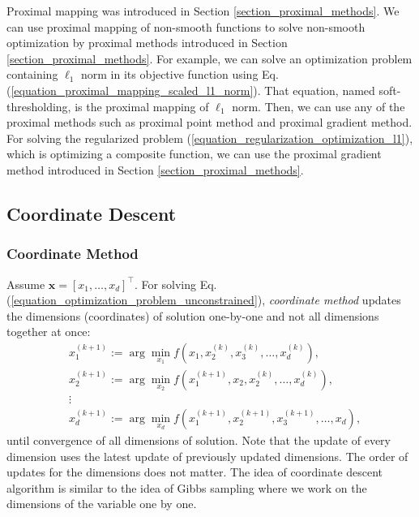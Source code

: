 \documentclass[lang=cn,10pt]{gorgeousnbook}
\numberwithin{equation}{section}%
\numberwithin{figure}{section}%
\begin{document}

Proximal mapping was introduced in Section \ref{section_proximal_methods}. We can use proximal mapping of non-smooth functions to solve non-smooth optimization by proximal methods introduced in Section \ref{section_proximal_methods}.
For example, we can solve an optimization problem containing $\ell_1$ norm in its objective function using Eq. (\ref{equation_proximal_mapping_scaled_l1_norm}). That equation, named soft-thresholding, is the proximal mapping of $\ell_1$ norm. Then, we can use any of the proximal methods such as proximal point method and proximal gradient method. 
For solving the regularized problem (\ref{equation_regularization_optimization_l1}), which is optimizing a composite function, we can use the proximal gradient method introduced in Section \ref{section_proximal_methods}. 

\subsection{Coordinate Descent}

\subsubsection{Coordinate Method}




Assume $\boldsymbol{x} = [x_1, \dots, x_d]^\top$.
For solving Eq. (\ref{equation_optimization_problem_unconstrained}), \textit{coordinate method} \cite{wright2015coordinate} updates the dimensions (coordinates) of solution one-by-one and not all dimensions together at once:
\begin{equation}\label{equation_coordinate_descent}
\begin{aligned}
& x_1^{(k+1)} := \arg\min_{x_1} f(x_1, x_2^{(k)}, x_3^{(k)}, \dots, x_d^{(k)}), \\
& x_2^{(k+1)} := \arg\min_{x_2} f(x_1^{(k+1)}, x_2, x_2^{(k)}, \dots, x_d^{(k)}), \\
&\vdots \\
& x_d^{(k+1)} := \arg\min_{x_d} f(x_1^{(k+1)}, x_2^{(k+1)}, x_3^{(k+1)}, \dots, x_d),
\end{aligned}
\end{equation}
until convergence of all dimensions of solution. 
Note that the update of every dimension uses the latest update of previously updated dimensions. 
The order of updates for the dimensions does not matter. 
The idea of coordinate descent algorithm is similar to the idea of Gibbs sampling \cite{geman1984stochastic,ghojogh2020sampling} where we work on the dimensions of the variable one by one.
\end{document}
